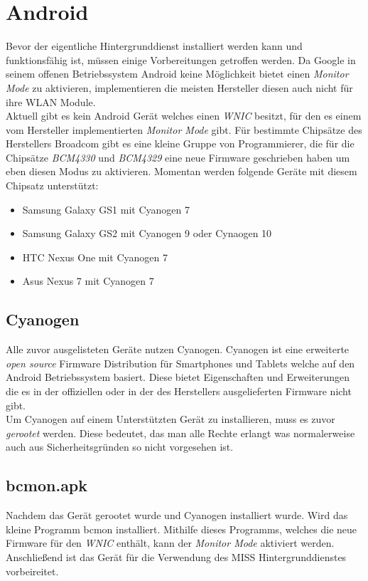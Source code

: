\documentclass[]{report}
\begin{document}
\section{Android}
Bevor der eigentliche Hintergrunddienst installiert werden kann und funktionsfähig ist, müssen einige Vorbereitungen getroffen werden. Da Google in seinem offenen Betriebssystem Android keine Möglichkeit bietet einen \textit{Monitor Mode} zu aktivieren, implementieren die meisten Hersteller diesen auch nicht für ihre WLAN Module.\\
Aktuell gibt es kein Android Gerät welches einen \textit{WNIC} besitzt, für den es einem vom Hersteller implementierten \textit{Monitor Mode} gibt. Für bestimmte Chipsätze des Herstellers Broadcom gibt es eine kleine Gruppe von Programmierer, die für die Chipsätze \textit{BCM4330} und \textit{BCM4329} eine neue Firmware geschrieben haben um eben diesen Modus zu aktivieren. Momentan werden folgende Geräte mit diesem Chipsatz unterstützt:
\begin{itemize}
\item Samsung Galaxy GS1 mit Cyanogen 7
\item Samsung Galaxy GS2 mit Cyanogen 9 oder Cynaogen 10
\item HTC Nexus One mit Cyanogen 7
\item Asus Nexus 7 mit Cyanogen 7
\end{itemize}
\subsection{Cyanogen}
Alle zuvor ausgelisteten Geräte nutzen Cyanogen. Cyanogen ist eine erweiterte \textit{open source} Firmware Distribution für Smartphones und Tablets welche auf den Android Betriebssystem basiert. Diese bietet Eigenschaften und Erweiterungen die es in der offiziellen oder in der des Herstellers ausgelieferten Firmware nicht gibt. \\
Um Cyanogen auf einem Unterstützten Gerät zu installieren, muss es zuvor \textit{gerootet} werden. Diese bedeutet, das man alle Rechte erlangt was normalerweise auch aus Sicherheitsgründen so nicht vorgesehen ist. 
\subsection{bcmon.apk}
Nachdem das Gerät gerootet wurde und Cyanogen installiert wurde. Wird das kleine Programm bcmon installiert. Mithilfe dieses Programms, welches die neue Firmware für den \textit{WNIC} enthält, kann der \textit{Monitor Mode} aktiviert werden. Anschließend ist das Gerät für die Verwendung des MISS Hintergrunddienstes vorbeireitet. 
\end{document}
